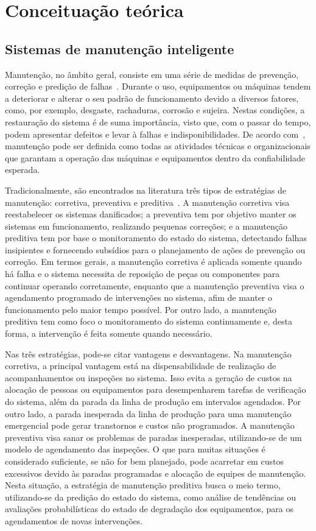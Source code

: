 \chapter{Conceituação teórica}

\section{Sistemas de manutenção inteligente}

Manutenção, no âmbito geral, consiste em uma série de medidas de prevenção, correção e predição de
falhas~\cite{lee2006intelligent}. Durante o uso, equipamentos ou máquinas tendem a deteriorar e
alterar o seu padrão de funcionamento devido a diversos fatores, como, por exemplo, desgaste,
rachaduras, corrosão e sujeira. Nestas condições, a restauração do sistema é de suma importância,
visto que, com o passar do tempo, podem apresentar defeitos e levar à falhas e indisponibilidades.
De acordo com~\cite{marcal2005detectando}, manutenção pode ser definida como todas as atividades
técnicas e organizacionais que garantam a operação das máquinas e equipamentos dentro da
confiabilidade esperada.

Tradicionalmente, são encontrados na literatura três tipos de estratégias de manutenção: corretiva,
preventiva e preditiva~\cite{goncalves2011desenvolvimento}. A manutenção corretiva visa
reestabelecer os sistemas danificados; a preventiva tem por objetivo manter os sistemas em
funcionamento, realizando pequenas correções; e a manutenção preditiva tem por base o monitoramento
do estado do sistema, detectando falhas insipientes e fornecendo subsídios para o planejamento de
ações de prevenção ou correção. Em termos gerais, a manutenção corretiva é aplicada somente quando
há falha e o sistema necessita de reposição de peças ou componentes para continuar operando
corretamente, enquanto que a manutenção preventiva visa o agendamento programado de intervenções no
sistema, afim de manter o funcionamento pelo maior tempo possível. Por outro lado, a manutenção
preditiva tem como foco o monitoramento do sistema continuamente e, desta forma, a intervenção é
feita somente quando necessário.

Nas três estratégias, pode-se citar vantagens e desvantagens. Na manutenção corretiva, a principal
vantagem está na dispensabilidade de realização de acompanhamentos ou inspeções no sistema. Isso
evita a geração de custos na alocação de pessoas ou equipamentos para desempenharem tarefas de
verificação do sistema, além da parada da linha de produção em intervalos agendados. Por outro lado,
a parada inesperada da linha de produção para uma manutenção emergencial pode gerar transtornos e
custos não programados. A manutenção preventiva visa sanar os problemas de paradas inesperadas,
utilizando-se de um modelo de agendamento das inspeções. O que para muitas situações é considerado
suficiente, se não for bem planejado, pode acarretar em custos excessivos devido às paradas
programadas e alocação de equipes de manutenção. Nesta situação, a estratégia de manutenção
preditiva busca o meio termo, utilizando-se da predição do estado do sistema, como análise de
tendências ou avaliações probabilísticas do estado de degradação dos equipamentos, para os
agendamentos de novas intervenções.

